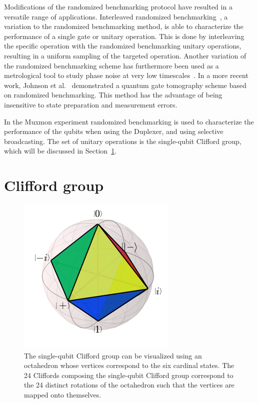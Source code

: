       Modifications of the randomized benchmarking protocol have resulted in a versatile range of applications. Interleaved randomized benchmarking~\cite{magesan2012efficient}, a variation to the randomized benchmarking method, is able to characterize the performance of a single gate or unitary operation. This is done by interleaving the specific operation with the randomized benchmarking unitary operations, resulting in a uniform sampling of the targeted operation. Another variation of the randomized benchmarking scheme has furthermore been used as a metrological tool to study phase noise at very low timescales~\cite{omalley2015qubit}. In a more recent work, Johnson et al.~\cite{johnson2015demonstration} demonstrated a quantum gate tomography scheme based on randomized benchmarking. This method has the advantage of being insensitive to state preparation and measurement errors.

      In the Muxmon experiment randomized benchmarking is used to characterize the performance of the qubits when using the Duplexer, and using selective broadcasting. The set of unitary operations is the single-qubit Clifford group, which will be discussed in Section~\ref{sec:Clifford group}.
    \section{Clifford group}
      \label{sec:Clifford group}

      \begin{figure}[h]%
        \begin{center}
          \includegraphics[width=.5\textwidth]{../Figures/Randomized benchmarking/Bloch sphere octahedron.png}
        \end{center}
        \caption{The single-qubit Clifford group can be visualized using an octahedron whose vertices correspond to the six cardinal states. The 24 Cliffords composing the single-qubit Clifford group correspond to the 24 distinct rotations of the octahedron such that the vertices are mapped onto themselves.}
        \label{fig:Clifford octahedron}
      \end{figure}


